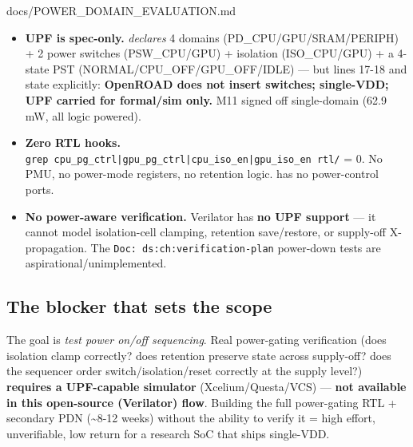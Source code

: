 \begin{relocated}{docs/POWER_DOMAIN_EVALUATION.md}
\begin{itemize}
\tightlist
\item
  \textbf{UPF is spec-only.} 
  \emph{declares} 4 domains
  (PD\_\allowbreak{}CPU/\allowbreak{}GPU/\allowbreak{}SRAM/\allowbreak{}PERIPH)
  + 2 power switches (PSW\_\allowbreak{}CPU/\allowbreak{}GPU) +
  isolation (ISO\_\allowbreak{}CPU/\allowbreak{}GPU) + a 4-state PST
  (NORMAL/\allowbreak{}CPU\_\allowbreak{}OFF/\allowbreak{}GPU\_\allowbreak{}OFF/\allowbreak{}IDLE)
  --- but lines 17-18 and  state
  explicitly: \textbf{OpenROAD does not insert switches; single-VDD; UPF
  carried for formal/\allowbreak{}sim only.} M11 signed off
  single-domain (62.9 mW, all logic powered).
\item
  \textbf{Zero RTL hooks.}
  \texttt{grep\ cpu\_\allowbreak{}pg\_\allowbreak{}ctrl|gpu\_\allowbreak{}pg\_\allowbreak{}ctrl|cpu\_\allowbreak{}iso\_\allowbreak{}en|gpu\_\allowbreak{}iso\_\allowbreak{}en\ rtl/\allowbreak{}}
  = 0. No PMU, no power-mode registers, no retention logic.
   has no power-control ports.
\item
  \textbf{No power-aware verification.} Verilator has \textbf{no UPF
  support} --- it cannot model isolation-cell clamping, retention
  save/\allowbreak{}restore, or supply-off X-propagation. The
  \texttt{Doc:\allowbreak{}\ ds:\allowbreak{}ch:\allowbreak{}verification-\allowbreak{}plan}
  power-down tests are aspirational/\allowbreak{}unimplemented.
\end{itemize}

\subsection{The blocker that sets the scope}\label{tm:pd:power-domain-evaluation:2-the-blocker-that-sets-the-scope}

The goal is \emph{test power on/off sequencing}. Real power-gating
verification (does isolation clamp correctly? does retention preserve
state across supply-off? does the sequencer order
switch/\allowbreak{}isolation/\allowbreak{}reset correctly at the supply
level?) \textbf{requires a UPF-capable simulator}
(Xcelium/\allowbreak{}Questa/\allowbreak{}VCS) --- \textbf{not available
in this open-source (Verilator) flow}. Building the full power-gating
RTL + secondary PDN (\textasciitilde8-12 weeks) without the ability to
verify it = high effort, unverifiable, low return for a research SoC
that ships single-VDD.


\end{relocated}
